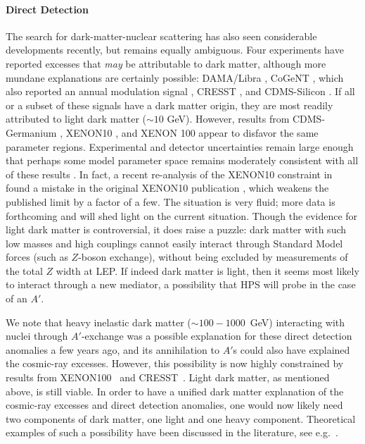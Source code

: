 \paragraph{Direct Detection}
 The search for dark-matter-nuclear scattering has also seen considerable developments recently, but remains equally ambiguous.  Four experiments have reported excesses that \emph{may} be attributable to dark matter, although more mundane explanations 
are certainly possible: DAMA/Libra \cite{Bernabei:2010mq}, CoGeNT \cite{Aalseth:2010vx}, which also reported an annual modulation signal \cite{Aalseth:2011wp},  CRESST \cite{Angloher:2011uu}, and CDMS-Silicon \cite{Agnese:2013dwa}. 
If all or a subset of these signals have a dark matter origin,  they are most readily attributed to light dark matter ($\sim 10$ GeV).  
However, results from CDMS-Germanium \cite{CDMS}, XENON10 \cite{Angle:2011th}, and XENON 100 \cite{Aprile:2011hi} appear to disfavor the same parameter regions.  Experimental and detector uncertainties remain large enough that perhaps some model parameter space remains 
moderately consistent with all of these results \cite{Kelso:2011gd,Frandsen:2013cna}.  In fact, a recent re-analysis of the XENON10 constraint in~\cite{Frandsen:2013cna} found a mistake in the original XENON10 publication \cite{Angle:2011th}, which weakens the published limit by a factor of a few.  The situation is very fluid; more data is forthcoming and will shed light on the current situation.
Though the evidence for light dark matter is controversial, it does raise a puzzle: dark matter with such low masses and high couplings cannot easily interact through Standard Model forces (such as $Z$-boson exchange), without being excluded by measurements of the total $Z$ width at LEP. If indeed dark matter is light, then it seems most likely to interact through a new mediator, a possibility that HPS will probe in the case of an $A'$.

We note that heavy inelastic dark matter ($\sim 100-1000$~GeV) interacting with nuclei through $A'$-exchange was a possible explanation for 
these direct detection anomalies a few years ago, and its annihilation to $A'$s could also have explained the cosmic-ray excesses.  However, 
this possibility is now highly constrained by results from XENON100~\cite{Aprile:2011ts} and CRESST~\cite{Angloher:2011uu}.  Light dark matter, 
as mentioned above, is still viable.  In order to have a unified dark matter explanation of the cosmic-ray excesses and direct detection 
anomalies, one would now likely need two components of dark matter, one light and one heavy component.  Theoretical examples of 
such a possibility have been discussed in the literature, see e.g.~\cite{Essig:2010ye}.


